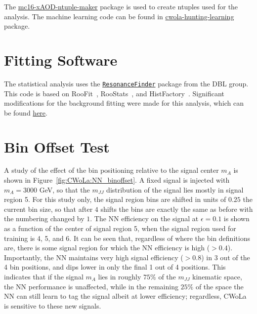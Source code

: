 The \href{https://gitlab.cern.ch/acukierm/mc16-xAOD-ntuple-maker}{mc16-xAOD-ntuple-maker} package is used to create ntuples used for the analysis.
The machine learning code can be found in \href{https://gitlab.cern.ch/cwola-hunting/cwola-hunting-learning}{cwola-hunting-learning} package.

\section{Fitting Software}
\label{app:CWoLa:fitting_software}
The statistical analysis uses the \href{https://gitlab.cern.ch/atlas-phys/exot/dbl/ResonanceFinder}{\texttt{ResonanceFinder}} package from the DBL group.
This code is based on RooFit~\cite{Verkerke:2003ir}, RooStats~\cite{Moneta:2010pm}, and HistFactory~\cite{Cranmer:1456844}.
Significant modifications for the background fitting were made for this analysis, which can be found \href{https://gitlab.cern.ch/cwola-hunting/fitting/tree/minimal}{here}.


\section{Bin Offset Test}
\label{app:CWoLa:binoffset}
A study of the effect of the bin positioning relative to the signal center $m_A$ is shown in Figure~\ref{fig:CWoLa:NN_binoffset}.
A fixed signal is injected with $m_A=3000$ GeV, so that the $m_{JJ}$ distribution of the signal lies mostly in signal region 5.
For this study only, the signal region bins are shifted in units of $0.25$ the current bin size, so that after $4$ shifts the bins are exactly the same as before with the numbering changed by $1$.
The NN efficiency on the signal at $\epsilon=0.1$ is shown as a function of the center of signal region 5, when the signal region used for training is 4, 5, and 6.
It can be seen that, regardless of where the bin definitions are, there is some signal region for which the NN efficiency is high ($>0.4$).
Importantly, the NN maintains very high signal efficiency ($>0.8$) in 3 out of the 4 bin positions, and dips lower in only the final 1 out of 4 positions.
This indicates that if the signal $m_A$ lies in roughly $75\%$ of the $m_{JJ}$ kinematic space, the NN performance is unaffected, while in the remaining $25\%$ of the space the NN can still learn to tag the signal albeit at lower efficiency; regardless, CWoLa is sensitive to these new signals.

